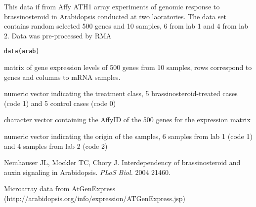 \begin{Description}\relax
This data if from Affy ATH1 array experiments of 
genomic response to brassinosteroid in Arabidopsis 
conducted at two laoratories. The data set contains 
random selected 500 genes and 10 samples, 6 from lab 1 and 4 from 
lab 2. Data was pre-processed by RMA
\end{Description}
\begin{Usage}
\begin{verbatim}data(arab)\end{verbatim}
\end{Usage}
\begin{Value}
\begin{ldescription}
\item[\code{arab}] matrix of gene expression levels of 500 genes 
from 10 samples, rows correspond to genes  and 
columns to mRNA samples.
\item[\code{arab.cl}] numeric vector indicating the treatment class, 
5 brassinosteroid-treated cases (code 1) 
and 5 control cases (code 0) 
\item[\code{arab.gnames}] character vector containing the AffyID of 
the 500 genes for the expression matrix 
\item[\code{arab.origin}] numeric vector indicating the origin of 
the samples, 6 samples from lab 1 (code 1) 
and 4 samples from lab 2 (code 2)
\end{ldescription}
\end{Value}
\begin{References}\relax
Nemhauser JL, Mockler TC, Chory J.  Interdependency of 
brassinosteroid and auxin signaling in Arabidopsis. 
\emph{PLoS Biol.} 2004 21460.

Microarray data from AtGenExpress 
(http://arabidopsis.org/info/expression/ATGenExpress.jsp)
\end{References}

